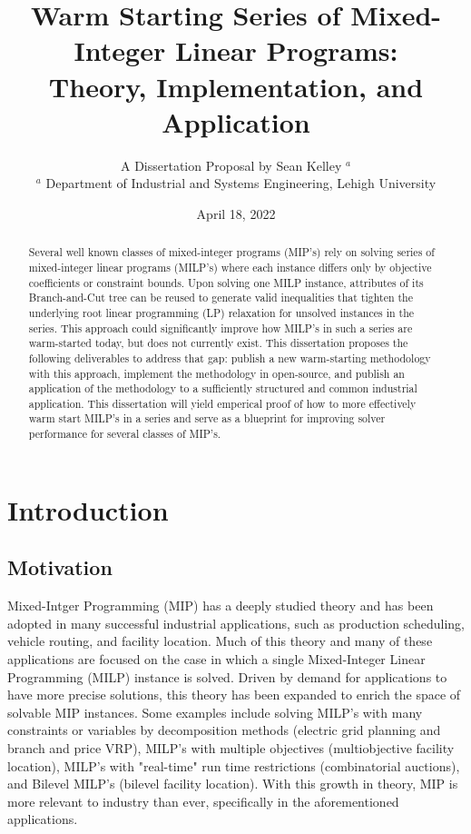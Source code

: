 \documentclass[10pt]{article}
\begin{document}
	\title{Warm Starting Series of Mixed-Integer Linear Programs: \\
		Theory, Implementation, and Application}
	\author{A Dissertation Proposal by Sean Kelley $^a$ \\
		$^a$ Department of Industrial and Systems Engineering, Lehigh University}
	\date{April 18, 2022}
	\maketitle
	
	\bigskip
	
	\begin{abstract}
		Several well known classes of mixed-integer programs (MIP's) rely on solving series of mixed-integer linear programs (MILP's) where each instance differs only by objective coefficients or constraint bounds. Upon solving one MILP instance, attributes of its Branch-and-Cut tree can be reused to generate valid inequalities that tighten the underlying root linear programming (LP) relaxation for unsolved instances in the series. This approach could significantly improve how MILP's in such a series are warm-started today, but does not currently exist. This dissertation proposes the following deliverables to address that gap: publish a new warm-starting methodology with this approach, implement the methodology in open-source, and publish an application of the methodology to a sufficiently structured and common industrial application. This dissertation will yield emperical proof of how to more effectively warm start MILP's in a series and serve as a blueprint for improving solver performance for several classes of MIP's.
	\end{abstract}
	
	\section{Introduction} \label{s:intro}
	
	\subsection{Motivation} \label{ss:motivation}
	Mixed-Intger Programming (MIP) has a deeply studied theory and has been adopted in many successful industrial applications, such as production scheduling, vehicle routing, and facility location. Much of this theory and many of these applications are focused on the case in which a single Mixed-Integer Linear Programming (MILP) instance is solved. Driven by demand for applications to have more precise solutions, this theory has been expanded to enrich the space of solvable MIP instances. Some examples include solving MILP's with many constraints or variables by decomposition methods (electric grid planning and branch and price VRP), MILP's with multiple objectives (multiobjective facility location), MILP's with "real-time" run time restrictions (combinatorial auctions), and Bilevel MILP's (bilevel facility location). With this growth in theory, MIP is more relevant to industry than ever, specifically in the aforementioned applications.
	
\end{document}
